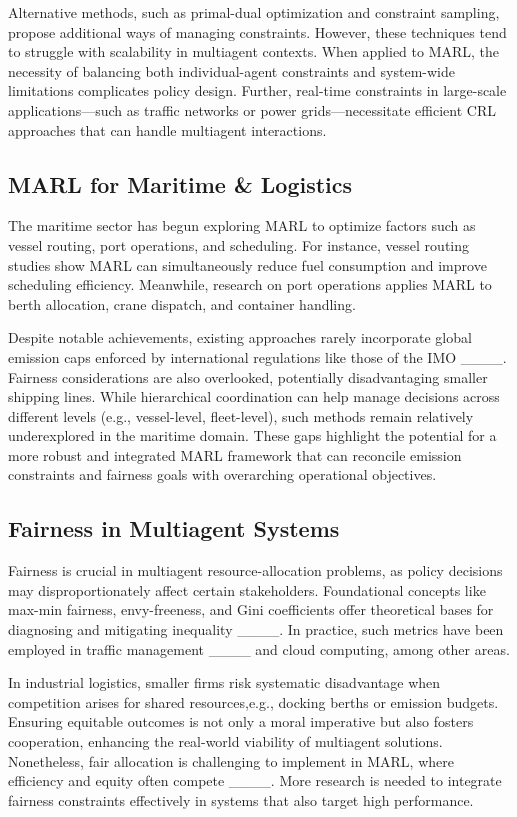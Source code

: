 Alternative methods, such as primal-dual optimization and constraint sampling, propose additional ways of managing constraints. However, these techniques tend to struggle with scalability in multiagent contexts. When applied to MARL, the necessity of balancing both individual-agent constraints and system-wide limitations complicates policy design. Further, real-time constraints in large-scale applications—such as traffic networks or power grids—necessitate efficient CRL approaches that can handle multiagent interactions.

\subsection{MARL for Maritime \& Logistics}
The maritime sector has begun exploring MARL to optimize factors such as vessel routing, port operations, and scheduling. For instance, vessel routing studies show MARL can simultaneously reduce fuel consumption and improve scheduling efficiency. Meanwhile, research on port operations applies MARL to berth allocation, crane dispatch, and container handling.

Despite notable achievements, existing approaches rarely incorporate global emission caps enforced by international regulations like those of the IMO ____. Fairness considerations are also overlooked, potentially disadvantaging smaller shipping lines. While hierarchical coordination can help manage decisions across different levels (e.g., vessel-level, fleet-level), such methods remain relatively underexplored in the maritime domain. These gaps highlight the potential for a more robust and integrated MARL framework that can reconcile emission constraints and fairness goals with overarching operational objectives.

\subsection{Fairness in Multiagent Systems}
Fairness is crucial in multiagent resource-allocation problems, as policy decisions may disproportionately affect certain stakeholders. Foundational concepts like max-min fairness, envy-freeness, and Gini coefficients offer theoretical bases for diagnosing and mitigating inequality ____. In practice, such metrics have been employed in traffic management ____ and cloud computing, among other areas.

In industrial logistics, smaller firms risk systematic disadvantage when competition arises for shared resources,e.g., docking berths or emission budgets. Ensuring equitable outcomes is not only a moral imperative but also fosters cooperation, enhancing the real-world viability of multiagent solutions. Nonetheless, fair allocation is challenging to implement in MARL, where efficiency and equity often compete ____. More research is needed to integrate fairness constraints effectively in systems that also target high performance.

